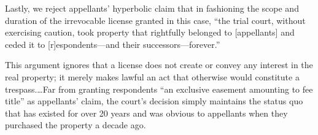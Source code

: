 Lastly, we reject appellants' hyperbolic claim that in fashioning the scope and
duration of the irrevocable license granted in this case, ``the trial court,
without exercising caution, took property that rightfully belonged to
[appellants] and ceded it to [r]espondents---and their successors---forever.''

This argument ignores that a license does not create or convey any interest in
the real property; it merely makes lawful an act that otherwise would constitute
a trespass.\ldots Far from granting respondents ``an exclusive easement
amounting to fee title'' as appellants' claim, the court's decision simply
maintains the status quo that has existed for over 20 years and was obvious to
appellants when they purchased the property a decade ago. 

